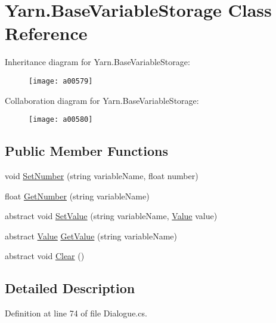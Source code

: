 \hypertarget{a00041}{\section{Yarn.\-Base\-Variable\-Storage Class Reference}
\label{a00041}
}


Inheritance diagram for Yarn.\-Base\-Variable\-Storage\-:
\nopagebreak
\begin{figure}[H]
\begin{center}
\leavevmode
\texttt{[image: a00579]}
\end{center}
\end{figure}


Collaboration diagram for Yarn.\-Base\-Variable\-Storage\-:
\nopagebreak
\begin{figure}[H]
\begin{center}
\leavevmode
\texttt{[image: a00580]}
\end{center}
\end{figure}
\subsection*{Public Member Functions}
\begin{DoxyCompactItemize}
\item 
void \hyperlink{a00041_a48b93de9cd7ae61d0cd9583c8330d3ee}{Set\-Number} (string variable\-Name, float number)
\item 
float \hyperlink{a00041_a1b7f7f4468b2463e7b47986d99362279}{Get\-Number} (string variable\-Name)
\item 
abstract void \hyperlink{a00041_a1c57d6d208b78abec0a670396771448e}{Set\-Value} (string variable\-Name, \hyperlink{a00165}{Value} value)
\item 
abstract \hyperlink{a00165}{Value} \hyperlink{a00041_a13b142df804d9842e97e628e252928e8}{Get\-Value} (string variable\-Name)
\item 
abstract void \hyperlink{a00041_a7e45c37f3662ce9f2643e306bb2b3adc}{Clear} ()
\end{DoxyCompactItemize}


\subsection{Detailed Description}


Definition at line 74 of file Dialogue.\-cs.



